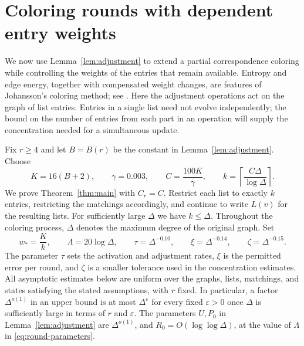 \section{Coloring rounds with dependent entry weights}\label{sec:rounds}

We now use Lemma~\ref{lem:adjustment} to extend a partial correspondence
coloring while controlling the weights of the entries that remain
available.  Entropy and edge energy, together with compensated weight
changes, are features of Johansson's coloring method; see
\cite[Sections~2 and~6--8]{BansalGuptaGuruganesh2018}.  Here the adjustment
operations act on the graph of list entries.  Entries in a single list need not evolve
independently; the bound on the number of entries from each part in an
operation will supply the concentration needed for a simultaneous update.

Fix $r\ge4$ and let $B=B(r)$ be the constant in
Lemma~\ref{lem:adjustment}.  Choose
\begin{equation}\label{eq:round-constants}
 K=16(B+2),\qquad \gamma=0.003,\qquad C=\frac{100K}{\gamma},\qquad
 k=\left\lceil\frac{C\Delta}{\log\Delta}\right\rceil.
\end{equation}
We prove Theorem~\ref{thm:main} with $C_r=C$.  Restrict each list to
exactly $k$ entries, restricting the matchings accordingly, and continue
to write $L(v)$ for the resulting lists.  For sufficiently large
$\Delta$ we have $k\le\Delta$.  Throughout the coloring process, $\Delta$
denotes the maximum degree of the original graph.  Set
\begin{equation}\label{eq:round-parameters}
 w_* = \frac Kk,\qquad \Lambda=20\log\Delta,\qquad
 \tau=\Delta^{-0.10},\qquad \xi=\Delta^{-0.14},\qquad
 \zeta=\Delta^{-0.15}.
\end{equation}
The parameter $\tau$ sets the activation and adjustment rates, $\xi$ is
the permitted error per round, and $\zeta$ is a smaller tolerance used
in the concentration estimates.
All asymptotic estimates below are uniform over the graphs, lists,
matchings, and states satisfying the stated assumptions, with $r$ fixed.
In particular, a factor $\Delta^{o(1)}$ in an upper bound is at most
$\Delta^\varepsilon$ for every fixed $\varepsilon>0$ once $\Delta$ is
sufficiently large in terms of $r$ and $\varepsilon$.  The parameters
$U,P_0$ in Lemma~\ref{lem:adjustment} are $\Delta^{o(1)}$, and
$R_0=O(\log\log\Delta)$, at the value of $\Lambda$ in
\eqref{eq:round-parameters}.


